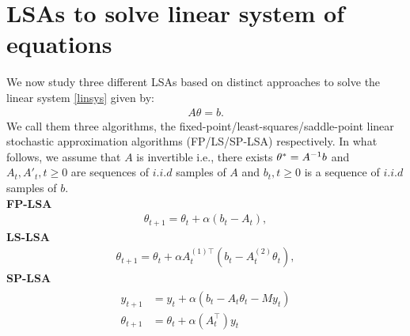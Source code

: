 \section{LSAs to solve linear system of equations}
We now study three different LSAs based on distinct approaches to solve the linear system \eqref{linsys} given by:
\begin{align}\label{linsys}
A\theta=b.
\end{align}
We call them three algorithms, the fixed-point/least-squares/saddle-point linear stochastic approximation algorithms (FP/LS/SP-LSA) respectively. In what follows, we assume that
$A$ is invertible i.e., there exists $\theta^*=A^{-1} b$ and $A_t,A'_t, t\geq 0$ are sequences of $i.i.d$ samples of $A$ and $b_t,t\geq 0$ is a sequence of $i.i.d$ samples of $b$.\\
\textbf{FP-LSA}
\begin{align}\label{fplsa}
\theta_{t+1}=\theta_t+\alpha(b_t-A_t),
\end{align}
\textbf{LS-LSA}
\begin{align}\label{lslsa}
\theta_{t+1}=\theta_t+\alpha A^{(1)\top}_t(b_t-A^{(2)}_t\theta_t),
\end{align}
\textbf{SP-LSA}
\begin{align}\label{splsa}
\begin{split}
y_{t+1}&=y_t+\alpha (b_t-A_t\theta_t- M y_t)\\
\theta_{t+1}&=\theta_t+\alpha(A_t^\top)y_t
\end{split}
\end{align}
